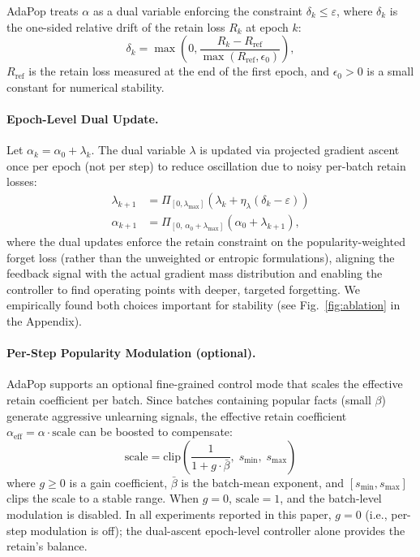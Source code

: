 AdaPop treats $\alpha$ as a dual variable enforcing the constraint $\delta_k \le \varepsilon$, where $\delta_k$ is the one-sided relative drift of the retain loss $R_k$ at epoch $k$:
\begin{equation}
\delta_k = \max\left( 0, \frac{R_k - R_{\mathrm{ref}}}{\max(R_{\mathrm{ref}}, \epsilon_0)} \right),
\end{equation}
$R_{\mathrm{ref}}$ is the retain loss measured at the end of the first epoch, and $\epsilon_0 > 0$ is a small constant for numerical stability.

\paragraph{Epoch-Level Dual Update.}
Let $\alpha_k = \alpha_0 + \lambda_k$. The dual variable $\lambda$ is updated via projected gradient ascent once per epoch (not per step) to reduce oscillation due to noisy per-batch retain losses:
\begin{align}
    \lambda_{k+1} &= \Pi_{[0, \lambda_{\max}]}\left( \lambda_k + \eta_\lambda (\delta_k - \varepsilon) \right) \\
    \alpha_{k+1} &= \Pi_{[0,\, \alpha_0 + \lambda_{\max}]}(\alpha_0 + \lambda_{k+1}),
\end{align}
where the dual updates enforce the retain constraint on the popularity-weighted forget loss (rather than the unweighted or entropic formulations), aligning the feedback signal with the actual gradient mass distribution and enabling the controller to find operating points with deeper, targeted forgetting. We empirically found both choices important for stability (see Fig.~\ref{fig:ablation} in the Appendix).

\paragraph{Per-Step Popularity Modulation (optional).}
AdaPop supports an optional fine-grained control mode that scales the effective retain coefficient per batch. Since batches containing popular facts (small $\beta$) generate aggressive unlearning signals, the effective retain coefficient $\alpha_{\mathrm{eff}} = \alpha \cdot \text{scale}$ can be boosted to compensate:
\begin{equation}
\text{scale} = \mathrm{clip}\!\left(\frac{1}{1 + g \cdot \bar{\beta}},\; s_{\min},\; s_{\max}\right)
\end{equation}
where $g \geq 0$ is a gain coefficient, $\bar{\beta}$ is the batch-mean exponent, and $[s_{\min}, s_{\max}]$ clips the scale to a stable range. When $g = 0$, $\text{scale} = 1$, and the batch-level modulation is disabled. In all experiments reported in this paper, $g = 0$ (i.e., per-step modulation is off); the dual-ascent epoch-level controller alone provides the retain's balance.

